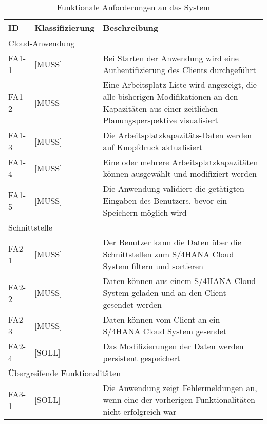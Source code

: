 \begin{table}[H]
	\centering
	\begin{tabularx}{\textwidth}{|l l X|} 
		\hline
		ID              &   
		Klassifizierung &   
		Beschreibung \\ 

		\hline\hline
		\multicolumn{3}{|l|}{Cloud-Anwendung} \\
		\hline
		FA1-1           &   
		[MUSS]          &   
		Bei Starten der Anwendung wird eine Authentifizierung des Clients durchgeführt  \\ 
		FA1-2           &   
		[MUSS]          &   
	    Eine Arbeitsplatz-Liste wird angezeigt, die alle bisherigen Modifikationen an den Kapazitäten aus einer zeitlichen Planungsperspektive visualisiert\\ 
		FA1-3           &   
		[MUSS]          &   
		Die Arbeitsplatzkapazitäts-Daten werden auf Knopfdruck aktualisiert  \\
		FA1-4           &   
		[MUSS]          &   
	    Eine oder mehrere Arbeitsplatzkapazitäten können ausgewählt und modifiziert werden  \\
	    FA1-5           &   
		[MUSS]          &   
	    Die Anwendung validiert die getätigten Eingaben des Benutzers, bevor ein Speichern möglich wird  \\ 
		\hline
		
		\hline\hline
		\multicolumn{3}{|l|}{Schnittstelle} \\
		\hline
		FA2-1           &   
		[MUSS]          &   
		Der Benutzer kann die Daten über die Schnittstellen zum S/4HANA Cloud System filtern und sortieren  \\ 
		FA2-2           &   
		[MUSS]          &   
	    Daten können aus einem S/4HANA Cloud System geladen und an den Client gesendet werden  \\ 
		FA2-3           &   
		[MUSS]          &   
		Daten können vom Client an ein S/4HANA Cloud System gesendet  \\
		FA2-4           &   
		[SOLL]          &   
		Das Modifizierungen der Daten werden persistent gespeichert  \\ 
		
		\hline\hline
		\multicolumn{3}{|l|}{Übergreifende Funktionalitäten} \\
		\hline
		FA3-1           &   
		[SOLL]          &   
		Die Anwendung zeigt Fehlermeldungen an, wenn eine der vorherigen Funktionalitäten nicht erfolgreich war  \\ 
		\hline
	\end{tabularx}
	\caption{\label{tab:anforderungen}Funktionale Anforderungen an das System}
\end{table}
% 
% 
% 
% 
% 
% 
